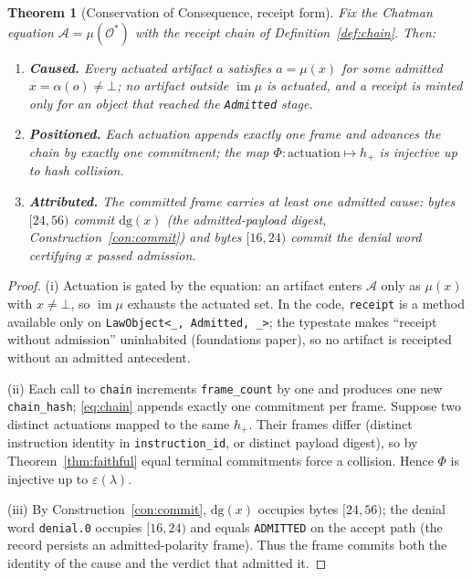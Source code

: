 \documentclass[11pt,oneside]{book}
\theoremstyle{definition}
\theoremstyle{plain}
\newtheorem{theorem}{Theorem}[chapter]
\theoremstyle{remark}
\newcommand{\Adm}{\mathcal{O}^{*}}             %
\newcommand{\Act}{\mathcal{A}}                 %
\newcommand{\muop}{\mu}                        %
\newcommand{\adm}{\alpha}                      %
\newcommand{\Rfsl}{\bot}                        %
\newcommand{\dg}{\mathrm{dg}}                   %
\DeclareMathOperator{\im}{im}
\newcommand{\code}[1]{\texttt{#1}}
\begin{document}
\begin{theorem}[Conservation of Consequence, receipt form]\label{thm:conservation}
Fix the Chatman equation $\Act=\muop(\Adm)$ with the receipt chain of
Definition~\ref{def:chain}. Then:
\begin{enumerate}[label=(\roman*),leftmargin=*]
\item \textbf{Caused.} Every actuated artifact $a$ satisfies $a=\muop(x)$ for some admitted
$x=\adm(o)\ne\Rfsl$; no artifact outside $\im\muop$ is actuated, and a receipt is minted only
for an object that reached the \code{Admitted} stage.
\item \textbf{Positioned.} Each actuation appends \emph{exactly one} frame and advances the
chain by \emph{exactly one} commitment; the map $\Phi:\text{actuation}\mapsto h_{+}$ is
injective up to hash collision.
\item \textbf{Attributed.} The committed frame carries at least one admitted cause: bytes
$[24,56)$ commit $\dg(x)$ (the admitted-payload digest, Construction~\ref{con:commit}) and
bytes $[16,24)$ commit the denial word certifying $x$ passed admission.
\end{enumerate}
\end{theorem}

\begin{proof}
(i) Actuation is gated by the equation: an artifact enters $\Act$ only as $\muop(x)$ with
$x\ne\Rfsl$, so $\im\muop$ exhausts the actuated set. In the code, \code{receipt} is a method
available only on \code{LawObject<\_, Admitted, \_>}; the typestate makes ``receipt without
admission'' uninhabited (foundations paper), so no artifact is receipted without an admitted
antecedent.

(ii) Each call to \code{chain} increments \code{frame\_count} by one and produces one new
\code{chain\_hash}; \eqref{eq:chain} appends exactly one commitment per frame. Suppose two
distinct actuations mapped to the same $h_{+}$. Their frames differ (distinct instruction
identity in \code{instruction\_id}, or distinct payload digest), so by
Theorem~\ref{thm:faithful} equal terminal commitments force a collision. Hence $\Phi$ is
injective up to $\varepsilon(\lambda)$.

(iii) By Construction~\ref{con:commit}, $\dg(x)$ occupies bytes $[24,56)$; the denial word
\code{denial.0} occupies $[16,24)$ and equals \code{ADMITTED} on the accept path (the record
persists an admitted-polarity frame). Thus the frame commits both the identity of the cause
and the verdict that admitted it. \end{proof}
\end{document}
